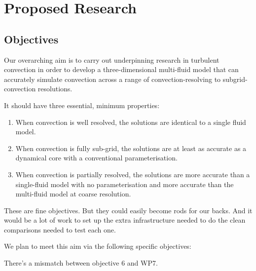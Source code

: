 \documentclass[11pt,a4paper]{article}
\begin{document}
\section{Proposed Research}

\subsection{Objectives}

Our overarching aim is to carry out underpinning research in turbulent convection in order to develop a three-dimensional multi-fluid model that can accurately simulate convection across a range of convection-resolving to subgrid-convection resolutions. {\color{red} It should have three essential, minimum properties:

\begin{enumerate}\renewcommand{\theenumi}{\alph{enumi}}
\item When convection is well resolved, the solutions are identical to a single fluid model.
\item When convection is fully sub-grid, the solutions are at least as accurate as a dynamical core with a conventional parameterisation.
\item When convection is partially resolved, the solutions are more accurate than a single-fluid model with no parameterisation and more accurate than the multi-fluid model at coarse resolution.
\end{enumerate}

These are fine objectives. But they could easily become rods for our backs. And it would be a lot of work to set up the extra infrastructure needed to do the clean comparisons needed to test each one. }


We plan to meet this aim via the following specific objectives:

{\color{red} There's a mismatch between objective 6 and WP7.}
\end{document}
